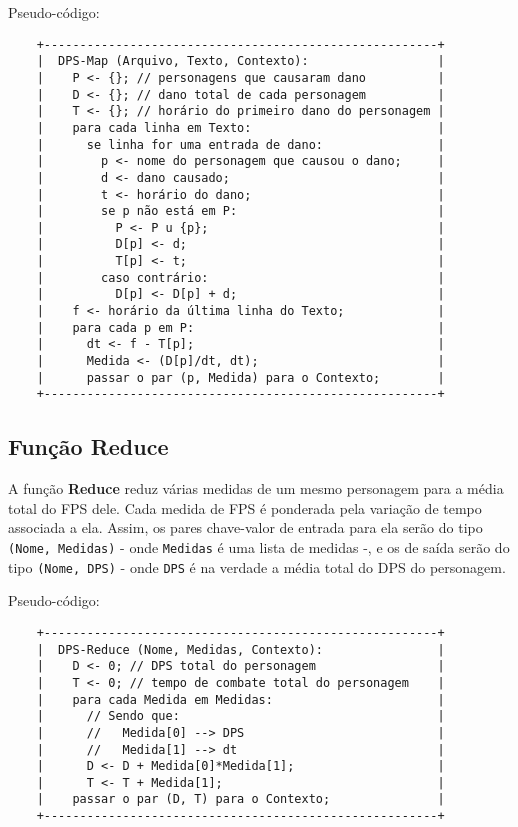 \documentclass[a4paper,11pt]{article}
\begin{document}
    Pseudo-código:
    
    \begin{verbatim}
    +-------------------------------------------------------+
    |  DPS-Map (Arquivo, Texto, Contexto):                  |
    |    P <- {}; // personagens que causaram dano          |
    |    D <- {}; // dano total de cada personagem          |
    |    T <- {}; // horário do primeiro dano do personagem |
    |    para cada linha em Texto:                          |
    |      se linha for uma entrada de dano:                |
    |        p <- nome do personagem que causou o dano;     |
    |        d <- dano causado;                             |
    |        t <- horário do dano;                          |
    |        se p não está em P:                            |
    |          P <- P u {p};                                |
    |          D[p] <- d;                                   |
    |          T[p] <- t;                                   |
    |        caso contrário:                                |
    |          D[p] <- D[p] + d;                            |
    |    f <- horário da última linha do Texto;             |
    |    para cada p em P:                                  |
    |      dt <- f - T[p];                                  |
    |      Medida <- (D[p]/dt, dt);                         |
    |      passar o par (p, Medida) para o Contexto;        |
    +-------------------------------------------------------+
    \end{verbatim}
  
  \subsection{Função \textbf{Reduce}}
  
    A função \textbf{Reduce} reduz várias medidas de um mesmo personagem para a
    média total do FPS dele. Cada medida de FPS é ponderada pela variação de
    tempo associada a ela. Assim, os pares chave-valor de entrada para ela serão
    do tipo \verb$(Nome, Medidas)$ - onde \verb$Medidas$ é uma lista de medidas
    -, e os de saída serão do tipo \verb$(Nome, DPS)$ - onde \verb$DPS$ é na
    verdade a média total do DPS do personagem.
    
    Pseudo-código:
    
    \begin{verbatim}
    +-------------------------------------------------------+
    |  DPS-Reduce (Nome, Medidas, Contexto):                |
    |    D <- 0; // DPS total do personagem                 |
    |    T <- 0; // tempo de combate total do personagem    |
    |    para cada Medida em Medidas:                       |
    |      // Sendo que:                                    |
    |      //   Medida[0] --> DPS                           |
    |      //   Medida[1] --> dt                            |
    |      D <- D + Medida[0]*Medida[1];                    |
    |      T <- T + Medida[1];                              |
    |    passar o par (D, T) para o Contexto;               |
    +-------------------------------------------------------+
    \end{verbatim}
\end{document}
